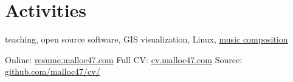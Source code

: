 \documentclass[10pt]{article}
\begin{document}



\section{Activities}
teaching, open source software, GIS visualization, Linux,
\href{https://soundcloud.com/malloc47}{music composition}

\null\vfill
\footnotesize{
  Online:  \href{http://resume.malloc47.com}{resume.malloc47.com} \hfill
  Full CV: \href{http://cv.malloc47.com}{cv.malloc47.com} \hfill
  Source:  \href{https://github.com/malloc47/cv}{github.com/malloc47/cv/}
}

\pagestyle{myheadings}

\end{document}
